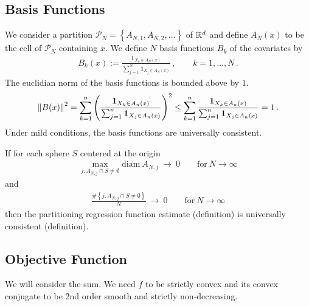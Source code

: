 \subsection*{Basis Functions}
We consider a partition
$
  \mathcal{P}_N
  =
  \left\{ 
    A_{N,1}
    ,
    A_{N,2}
    ,
    \ldots
  \right\}
$
of $ \mathbb{R}^d $
and define
$ A_N(x) $ to be the cell of $ \mathcal{P}_N $ containing $x$.
We define $N$ basis functions $B_k$ of the covariates by
\begin{gather*}
  B_k(x)
  :=
  \frac{
  \mathbf{1}_{X_k \in A_N(x)}
  }{
  \sum_{j=1}^{N} 
  \mathbf{1}_{X_j \in A_N(x)}
  }
  \,,
  \qquad
  k=
  1,\ldots,N
  \,.
\end{gather*}
The euclidian norm of the basis functions is bounded above by $1$.
\begin{gather*}
  \left\lVert B(x)\right\rVert^2
  =
  \sum_{k=1}^{n} 
  \left( 
  \frac{
  \mathbf{1}_{X_k \in A_n(x)}
  }{
  \sum_{j=1}^{n} 
  \mathbf{1}_{X_j \in A_n(x)}
  }
  \right)
  ^2
  \le
  \sum_{k=1}^{n} 
  \frac{
  \mathbf{1}_{X_k \in A_n(x)}
  }{
  \sum_{j=1}^{n} 
  \mathbf{1}_{X_j \in A_n(x)}
  }
  =1
  \,.
\end{gather*}
Under mild conditions, the basis functions are universally consistent.
\begin{theorem}
  If for each sphere $S$ centered at the origin 
  \begin{gather}
    \max
    _
    {
      j\colon
      A_{N,j} 
      \cap
      S
      \neq
      \emptyset
    }
    \mathrm{diam}
    \ 
      A_{N,j} 
      \ 
      \to
      \ 
      0
      \qquad
      \text{for}\ 
      N\to \infty 
  \end{gather}
  and
  \begin{gather}
    \frac
    {
    \#
    \left\{  
      j\colon
      A_{N,j} 
      \cap
      S
      \neq
      \emptyset
    \right\}
    }
    {N}
      \ 
      \to
      \ 
      0
      \qquad
      \text{for}\ 
      N\to \infty 
  \end{gather}
  then the partitioning regression function estimate 
  (definition)
  is
  universally consistent (definition).
\end{theorem}

\subsection*{Objective Function}
We will consider the sum.
We need $f$ to be strictly convex and its convex conjugate
to be 2nd order smooth and strictly non-decreasing.
